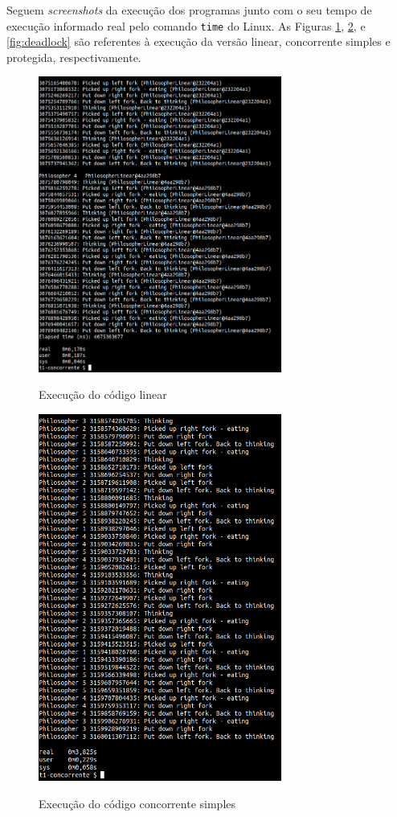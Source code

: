 \documentclass[conference]{IEEEtran}
\begin{document}
Seguem \textit{screenshots} da execução dos programas junto com o seu tempo de execução informado real pelo comando \verb|time| do Linux. As Figuras \ref{fig:linear}, \ref{fig:concorrente}, e \ref{fig:deadlock} são referentes à execução da versão linear, concorrente simples e protegida, respectivamente.

\begin{figure}[h!]
\caption{Execução do código linear}
\centering
\includegraphics[width=8cm]{lin}
\label{fig:linear}
\end{figure}

\begin{figure}[h!]
\caption{Execução do código concorrente simples}
\centering
\includegraphics[width=8cm]{con}
\label{fig:concorrente}
\end{figure}
\end{document}
